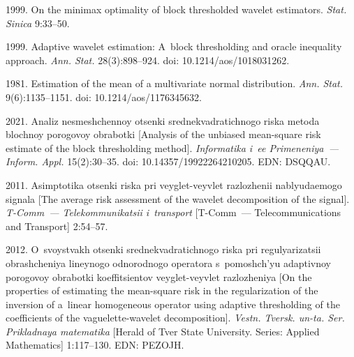   \begin{multicols}{2}

\renewcommand{\bibname}{\protect\rmfamily References}

{\small\frenchspacing
 {%
 \begin{thebibliography}{99} 
 
 \vspace*{-5pt}
 1999. On the minimax optimality of block thresholded wavelet estimators. \textit{Stat. Sinica} 9:33--50.

 1999. Adaptive wavelet estimation: A~block thresholding and oracle inequality approach. 
\textit{Ann. Stat.} 28(3):898--924. doi: 10.1214/aos/1018031262.

1981. Estimation of the mean of a multivariate normal distribution. \textit{Ann. Stat.} 9(6):1135--1151. doi: 10.1214/aos/1176345632.

 2021. 
Analiz nesmeshchennoy otsenki srednekvadratichnogo riska metoda blochnoy po\-ro\-go\-voy obrabotki 
[Analysis of the unbiased mean-square risk estimate of the block thresholding method]. 
\textit{Informatika i~ee Primeneniya~--- Inform. Appl.} 15(2):30--35. doi: 10.14357/19922264210205. EDN: DSQQAU.

 2011. Asimptotika otsenki riska pri veyglet-veyvlet razlozhenii nablyuda\-emo\-go signala [The average risk assessment of the wavelet decomposition of the signal]. 
 \textit{T-Comm~--- Telekommunikatsii i~transport} [T-Comm~--- Telecommunications and Transport] 2:54--57.

 2012. 
O~svoystvakh otsenki sred\-ne\-kvad\-ra\-tich\-no\-go riska pri regulyarizatsii obrashcheniya lineynogo odnorodnogo operatora 
s~pomoshch'yu adaptivnoy porogovoy obrabotki koeffitsientov veyglet-veyvlet raz\-lo\-zhe\-niya 
[On the properties of estimating the mean-square risk in the regularization of the inversion of a~linear homogeneous operator using adaptive 
thresholding of the coefficients of the vaguelette-wavelet decomposition]. 
\textit{Vestn. Tversk. un-ta. Ser. Prikladnaya matematika} [Herald of Tver State University. Series: Applied Mathematics] 1:117--130. EDN: PEZOJH.


\end{thebibliography}}}
\end{multicols}
